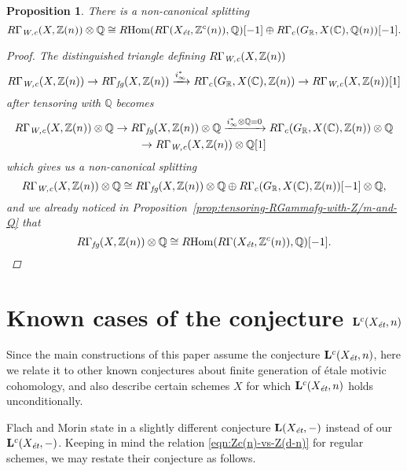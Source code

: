 \documentclass[leqno,12pt]{article}
\theoremstyle{plain}
\newtheorem{proposition}[theorem]{\indent\sc Proposition}
\theoremstyle{definition}
\DeclareMathOperator{\Hom}{Hom}
\newcommand{\CC}{\mathbb{C}}
\newcommand{\QQ}{\mathbb{Q}}
\newcommand{\RR}{\mathbb{R}}
\newcommand{\ZZ}{\mathbb{Z}}
\newcommand{\Wc}{\text{\it W,c}}
\newcommand{\et}{\text{\it \'{e}t}}
\newcommand{\fg}{\text{\it fg}}
\newcommand{\RHom}{R\!\Hom}
\begin{document}
\begin{proposition}
  There is a non-canonical splitting
  \[ R\Gamma_\Wc (X, \ZZ(n)) \otimes \QQ \cong
    \RHom (R\Gamma (X_\et, \ZZ^c (n)), \QQ) [-1] \oplus
    R\Gamma_c (G_\RR, X (\CC), \QQ (n)) [-1]. \]

  \begin{proof}
    The distinguished triangle defining $R\Gamma_\Wc (X, \ZZ(n))$
    \[ R\Gamma_\Wc (X, \ZZ (n)) \to
      R\Gamma_\fg (X, \ZZ(n)) \xrightarrow{i_\infty^*}
      R\Gamma_c (G_\RR, X (\CC), \ZZ(n)) \to
      R\Gamma_\Wc (X, \ZZ (n)) [1] \]
    after tensoring with $\QQ$ becomes
    \begin{multline*}
      R\Gamma_\Wc (X, \ZZ (n))\otimes \QQ \to
      R\Gamma_\fg (X, \ZZ(n))\otimes \QQ \xrightarrow{i_\infty^*\otimes\QQ = 0}
      R\Gamma_c (G_\RR, X (\CC), \ZZ(n))\otimes \QQ \\
      \to R\Gamma_\Wc (X, \ZZ (n))\otimes \QQ [1]
    \end{multline*}
    which gives us a non-canonical splitting \cite[Chapitre~II,
    Corollaire~1.2.6]{Verdier-thesis}
    \[ R\Gamma_\Wc (X, \ZZ (n))\otimes \QQ \cong
      R\Gamma_\fg (X, \ZZ(n))\otimes \QQ \oplus
      R\Gamma_c (G_\RR, X (\CC), \ZZ(n)) [-1]\otimes \QQ, \]
    and we already noticed in
    Proposition~\ref{prop:tensoring-RGammafg-with-Z/m-and-Q} that
    \[ R\Gamma_\fg (X, \ZZ (n)) \otimes \QQ \cong
      \RHom (R\Gamma (X_\et, \ZZ^c (n)), \QQ) [-1]. \qedhere \]
  \end{proof}
\end{proposition}


\section{Known cases of the conjecture $\mathbf{L}^c (X_\et,n)$}
\label{sec:known-cases-of-Lc-Xet-n}

Since the main constructions of this paper assume the conjecture
$\mathbf{L}^c (X_\et,n)$, here we relate it to other known conjectures about
finite generation of \'{e}tale motivic cohomology, and also describe certain
schemes $X$ for which $\mathbf{L}^c (X_\et,n)$ holds unconditionally.

\vspace{1em}

Flach and Morin state in \cite{Flach-Morin-2018} a slightly different conjecture
$\mathbf{L} (X_\et, -)$ instead of our $\mathbf{L}^c (X_\et,-)$. Keeping in mind
the relation \eqref{eqn:Zc(n)-vs-Z(d-n)} for regular schemes, we may restate
their conjecture as follows.
\end{document}
